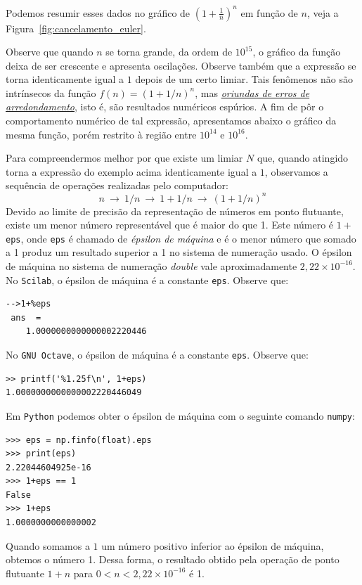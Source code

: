 \begin{ex}
Podemos resumir esses dados no gráfico de $\left(1+\frac{1}{n}\right)^n$ em função de $n$, veja a Figura~\ref{fig:cancelamento_euler}.

Observe que quando $n$ se torna grande, da ordem de $10^{15}$, o gráfico da função deixa de ser crescente e apresenta oscilações.  Observe também que a expressão se torna identicamente igual a $1$ depois de um certo limiar. Tais fenômenos não são intrínsecos da função $f(n)=(1+1/n)^n$, mas \emph{\uline{oriundas de erros de arredondamento}}, isto é, são resultados numéricos espúrios. A fim de pôr o comportamento numérico de tal expressão, apresentamos abaixo o gráfico da mesma função, porém restrito à região entre $10^{14}$ e $10^{16}$.

Para compreendermos melhor por que existe um limiar $N$ que, quando atingido torna a expressão do exemplo acima identicamente igual a $1$, observamos a sequência de operações realizadas pelo computador:
\begin{equation}\label{seq_oper}
n~\to ~1/n ~\to ~1+1/n ~\to ~(1+1/n)^n
\end{equation}
Devido ao limite de precisão da representação de números em ponto flutuante, existe um menor número representável que é maior do que 1. Este número é $1 + $\verb+eps+, onde \verb+eps+ é chamado de \emph{épsilon de máquina} e é o menor número que somado a 1 produz um resultado superior a 1 no sistema de numeração usado. O épsilon de máquina no sistema de numeração \emph{double} vale aproximadamente $2,22\times 10^{-16}$.
\ifisscilab
No \verb+Scilab+, o épsilon de máquina é a constante \verb+eps+. Observe que:
\begin{verbatim}
-->1+%eps
 ans  =
    1.0000000000000002220446
\end{verbatim}
\fi
\ifisoctave
No \verb+GNU Octave+, o épsilon de máquina é a constante \verb+eps+. Observe que:
\begin{verbatim}
>> printf('%1.25f\n', 1+eps)
1.0000000000000002220446049
\end{verbatim}
\fi
\ifispython
Em \verb+Python+ podemos obter o épsilon de máquina com o seguinte comando \verb+numpy+:
\begin{verbatim}
>>> eps = np.finfo(float).eps
>>> print(eps)
2.22044604925e-16
>>> 1+eps == 1
False
>>> 1+eps
1.0000000000000002
\end{verbatim}
\fi
Quando somamos a $1$ um número positivo inferior ao épsilon de máquina, obtemos o número 1. Dessa forma, o resultado obtido pela operação de ponto flutuante $1+n$ para $0<n<2,22 \times 10^{-16}$ é 1.


\end{ex}
